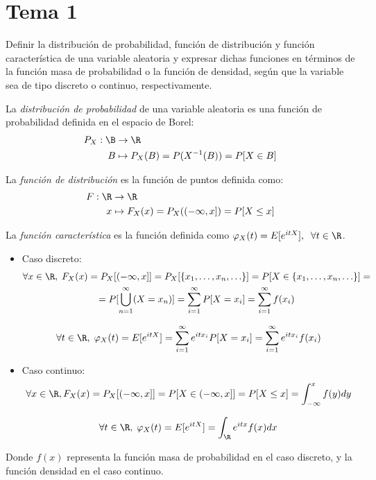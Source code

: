 \section{Tema 1}

\begin{ejer}
  Definir la distribución de probabilidad, función de distribución y función característica de una variable aleatoria y expresar dichas funciones en términos de la función masa de probabilidad o la función de densidad, según que la variable sea de tipo discreto o continuo, respectivamente.
\end{ejer}

\begin{sol}
  La \emph{distribución de probabilidad} de una variable aleatoria es una función de probabilidad definida en el espacio de Borel:
  \begin{align*}
    P_X : \B & \to \R \\
    B & \mapsto P_X(B) = P(X^{-1}(B)) = P[X \in B]
  \end{align*}

  La \emph{función de distribución} es la función de puntos definida como:
  \begin{align*}
    F: \R & \to \R \\
    x & \mapsto  F_X(x) = P_X((-\infty, x]) = P[X \leq x]
  \end{align*}

  La \emph{función característica} es la función definida como $\varphi_X(t) = E[e^{itX}], \; \; \forall t \in \R$.

  \begin{itemize}
    \item Caso discreto:
    \begin{multline*}
      \forall x \in \R, \; F_X(x) = P_X[(-\infty, x]] = P_X[\{x_1, \ldots, x_n, \ldots \}] = P[X \in \{x_1,  \ldots, x_n, \ldots \}] = \\
      = P[\bigcup \limits^\infty_{n = 1} (X = x_n)] = \sum \limits^\infty_{i = 1} P[X = x_i] = \sum \limits^\infty_{i = 1} f(x_i)
    \end{multline*}

    $$\forall t \in \R, \; \varphi_X(t) = E[e^{itX}] = \sum \limits^\infty_{i = 1} e^{itx_i}P[X = x_i] = \sum \limits^\infty_{i = 1} e^{itx_i} f(x_i)$$

    \item Caso continuo:
    $$\forall x \in \R, F_X(x) = P_X[(-\infty,x]] = P[X \in (-\infty, x]] = P[X \leq x] = \int^x_{-\infty} f(y)dy$$

    $$\forall t \in \R, \; \varphi_X(t) = E[e^{itX}] = \int_\R e^{itx} f(x) dx$$
  \end{itemize}
  Donde $f(x)$ representa la función masa de probabilidad en el caso discreto, y la función densidad en el caso continuo.
\end{sol}

